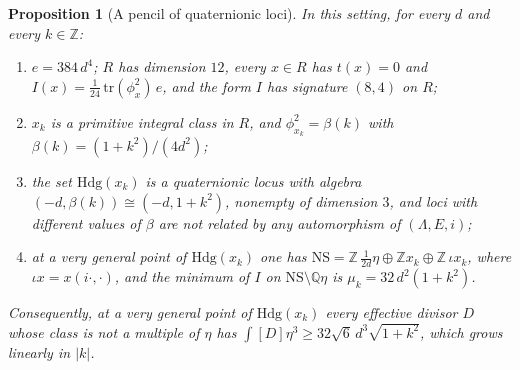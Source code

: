 \documentclass[11pt,reqno]{amsart}
\theoremstyle{plain}
\newtheorem{proposition}[theorem]{Proposition}
\theoremstyle{definition}
\theoremstyle{remark}
\newcommand{\QQ}{\mathbb{Q}}
\newcommand{\ZZ}{\mathbb{Z}}
\newcommand{\NS}{\mathrm{NS}}
\begin{document}
\begin{proposition}[A pencil of quaternionic loci]\label{prop:pencil}
In this setting, for every $d$ and every $k\in\ZZ$:
\begin{enumerate}[label=\textup{(\roman*)},nosep]
\item $e=384\,d^{4}$; $R$ has dimension $12$, every $x\in R$ has $t(x)=0$
  and $I(x)=\tfrac{1}{24}\,\mathrm{tr}(\phi_{x}^{2})\,e$, and the form $I$ has
  signature $(8,4)$ on $R$;
\item $x_{k}$ is a primitive integral class in $R$, and
  $\phi_{x_{k}}^{2}=\beta(k)$ with $\beta(k)=(1+k^{2})/(4d^{2})$;
\item the set $\mathrm{Hdg}(x_{k})$ is a quaternionic locus with algebra
  $(-d,\beta(k))\cong(-d,1+k^{2})$, nonempty of dimension $3$, and loci with
  different values of $\beta$ are not related by any automorphism of
  $(\Lambda,E,i)$;
\item at a very general point of $\mathrm{Hdg}(x_{k})$ one has
  $\NS=\ZZ\,\tfrac{1}{2d}\eta\oplus\ZZ x_{k}\oplus\ZZ\,\iota x_{k}$, where
  $\iota x=x(i\cdot,\cdot)$, and the minimum of $I$ on $\NS\setminus\QQ\eta$
  is $\mu_{k}=32\,d^{2}(1+k^{2})$.
\end{enumerate}
Consequently, at a very general point of $\mathrm{Hdg}(x_{k})$ every effective
divisor $D$ whose class is not a multiple of $\eta$ has
$\int[D]\eta^{3}\ge32\sqrt{6}\,d^{3}\sqrt{1+k^{2}}$, which grows linearly in
$|k|$.
\end{proposition}
\end{document}
